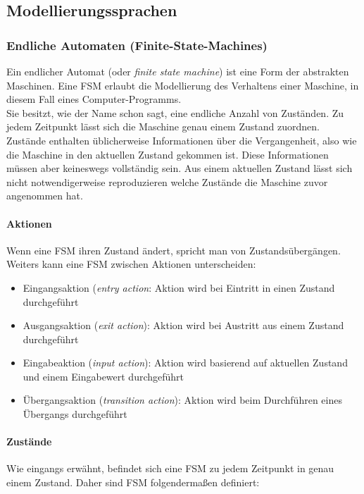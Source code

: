 \subsection{Modellierungssprachen}
\label{sec:notations}
\subsubsection{Endliche Automaten (Finite-State-Machines)}
\label{sec:fsm}
Ein endlicher Automat (oder \textit{finite state machine}) ist eine Form der abstrakten Maschinen. Eine FSM erlaubt die Modellierung des Verhaltens einer Maschine, in diesem Fall eines Computer-Programms.\cite{wagner_modeling_2006}\\
Sie besitzt, wie der Name schon sagt, eine endliche Anzahl von Zuständen. Zu jedem Zeitpunkt lässt sich die Maschine genau einem Zustand zuordnen. Zustände enthalten üblicherweise Informationen über die Vergangenheit, also wie die Maschine in den aktuellen Zustand gekommen ist. Diese Informationen müssen aber keineswegs vollständig sein. Aus einem aktuellen Zustand lässt sich nicht notwendigerweise reproduzieren welche Zustände die Maschine zuvor angenommen hat.\\

\paragraph{Aktionen}
Wenn eine FSM ihren Zustand ändert, spricht man von Zustandsübergängen. Weiters kann eine FSM zwischen Aktionen unterscheiden:
\begin{itemize}
\item Eingangsaktion (\textit{entry action}: Aktion wird bei Eintritt in einen Zustand durchgeführt
\item Ausgangsaktion (\textit{exit action}): Aktion wird bei Austritt aus einem Zustand durchgeführt
\item Eingabeaktion (\textit{input action}): Aktion wird basierend auf aktuellen Zustand und einem Eingabewert durchgeführt
\item Übergangsaktion (\textit{transition action}): Aktion wird beim Durchführen eines Übergangs durchgeführt
\end{itemize}

\paragraph{Zustände}
Wie eingangs erwähnt, befindet sich eine FSM zu jedem Zeitpunkt in genau einem Zustand. Daher sind FSM folgendermaßen definiert: 

